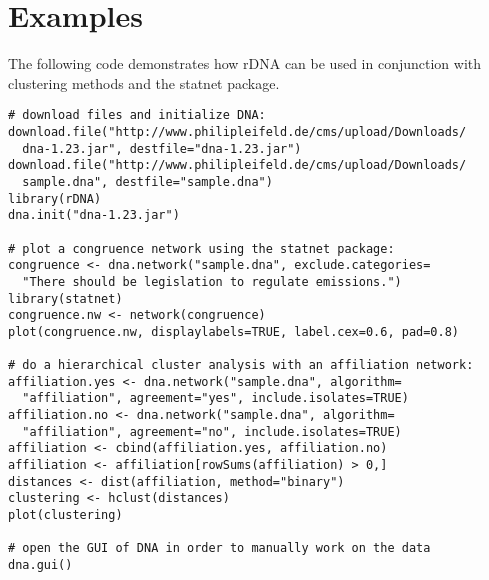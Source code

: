 \documentclass[a4paper, 10pt]{article}
\begin{document}
\section{Examples}
The following code demonstrates how rDNA can be used in conjunction with clustering methods and the statnet package.
\begin{verbatim}
# download files and initialize DNA:
download.file("http://www.philipleifeld.de/cms/upload/Downloads/
  dna-1.23.jar", destfile="dna-1.23.jar")
download.file("http://www.philipleifeld.de/cms/upload/Downloads/
  sample.dna", destfile="sample.dna")
library(rDNA)
dna.init("dna-1.23.jar")

# plot a congruence network using the statnet package:
congruence <- dna.network("sample.dna", exclude.categories=
  "There should be legislation to regulate emissions.")
library(statnet)
congruence.nw <- network(congruence)
plot(congruence.nw, displaylabels=TRUE, label.cex=0.6, pad=0.8)

# do a hierarchical cluster analysis with an affiliation network:
affiliation.yes <- dna.network("sample.dna", algorithm=
  "affiliation", agreement="yes", include.isolates=TRUE)
affiliation.no <- dna.network("sample.dna", algorithm=
  "affiliation", agreement="no", include.isolates=TRUE)
affiliation <- cbind(affiliation.yes, affiliation.no)
affiliation <- affiliation[rowSums(affiliation) > 0,]
distances <- dist(affiliation, method="binary")
clustering <- hclust(distances)
plot(clustering)

# open the GUI of DNA in order to manually work on the data
dna.gui()

\end{verbatim}
\end{document}

